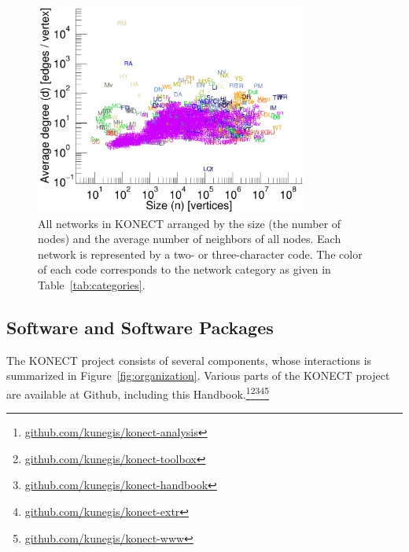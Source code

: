 \documentclass{article}
\begin{document}
\begin{figure}
  \centering
  \includegraphics[width=0.8\textwidth]{plot/scatter.c.size.avgdegree.everything}
  \caption[*]{
    All networks in KONECT
    arranged by the size (the number of nodes) and the
    average number of neighbors of all nodes.  Each network is
    represented by a two- or three-character code. The color of each
    code corresponds to the network 
    category as given in Table~\ref{tab:categories}.  
  }
  \label{fig:scatter.size.avgdegree}
\end{figure}

\subsection{Software and Software Packages}
The KONECT project consists of several components, whose interactions is
summarized in Figure~\ref{fig:organization}.  Various parts of the
KONECT project are available at Github, including this Handbook.\footnote{\href{https://github.com/kunegis/konect-analysis}{github.com/kunegis/konect-analysis}}\footnote{\href{https://github.com/kunegis/konect-toolbox}{github.com/kunegis/konect-toolbox}}\footnote{\href{https://github.com/kunegis/konect-handbook}{github.com/kunegis/konect-handbook}}\footnote{\href{https://github.com/kunegis/konect-extr}{github.com/kunegis/konect-extr}}\footnote{\href{https://github.com/kunegis/konect-www}{github.com/kunegis/konect-www}}
\end{document}
